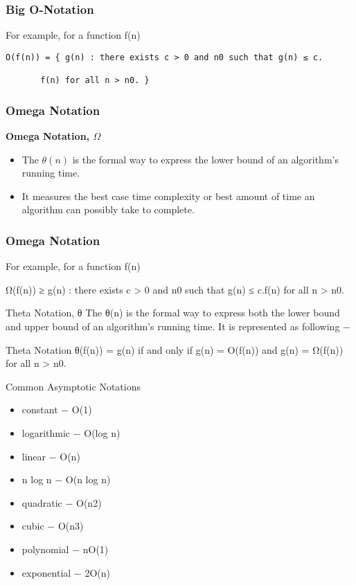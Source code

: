 \documentclass{beamer}
\begin{document}
\begin{frame}[fragile]
\frametitle{Big O-Notation}
For example, for a function f(n)
\begin{verbatim}
Ο(f(n)) = { g(n) : there exists c > 0 and n0 such that g(n) ≤ c.

       f(n) for all n > n0. }
\end{verbatim}
\end{frame}
\begin{frame}
\frametitle{Omega Notation}
\large
\noindent \textbf{Omega Notation, $\Omega$}
\begin{itemize}
\item The $\theta (n)$ is the formal way to express the lower bound of an algorithm's running time. 
\item It measures the best case time complexity or best amount of time an algorithm can possibly take to complete.
\end{itemize}
\end{frame}
\begin{frame}
\frametitle{Omega Notation}
\large
For example, for a function f(n)

Ω(f(n)) ≥ { g(n) : there exists c > 0 and n0 such that g(n) ≤ c.f(n) for all n > n0. }

Theta Notation, θ
The θ(n) is the formal way to express both the lower bound and upper bound of an algorithm's running time. It is represented as following −
\end{frame}
\begin{frame}
Theta Notation
θ(f(n)) = { g(n) if and only if g(n) =  Ο(f(n)) and g(n) = Ω(f(n)) for all n > n0. }
\end{frame}
\begin{frame}
Common Asymptotic Notations
\begin{itemize}
\item constant	−	Ο(1)
\item logarithmic	−	Ο(log n)
\item linear	−	Ο(n)
\item n log n	−	Ο(n log n)
\item quadratic	−	Ο(n2)
\item cubic	−	Ο(n3)
\item polynomial	−	nΟ(1)
\item exponential	−	2Ο(n)
\end{itemize}
\end{frame}
\end{document}
